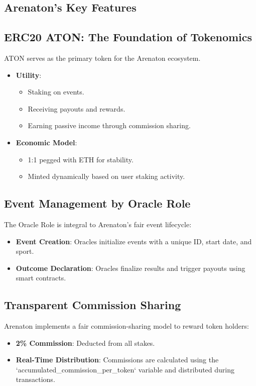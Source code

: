 \documentclass[9pt]{article}
\begin{document}
\begin{multicols}{2}
		\section{Arenaton’s Key Features}
		\subsection{ERC20 ATON: The Foundation of Tokenomics}
		ATON serves as the primary token for the Arenaton ecosystem.
		\begin{itemize}
			\item \textbf{Utility}:
			\begin{itemize}
				\item Staking on events.
				\item Receiving payouts and rewards.
				\item Earning passive income through commission sharing.
			\end{itemize}
			\item \textbf{Economic Model}:
			\begin{itemize}
				\item 1:1 pegged with ETH for stability.
				\item Minted dynamically based on user staking activity.
			\end{itemize}
		\end{itemize}
		
		\subsection{Event Management by Oracle Role}
		The Oracle Role is integral to Arenaton’s fair event lifecycle:
		\begin{itemize}
			\item \textbf{Event Creation}: Oracles initialize events with a unique ID, start date, and sport.
			\item \textbf{Outcome Declaration}: Oracles finalize results and trigger payouts using smart contracts.
		\end{itemize}
		
		\subsection{Transparent Commission Sharing}
		Arenaton implements a fair commission-sharing model to reward token holders:
		\begin{itemize}
			\item \textbf{2\% Commission}: Deducted from all stakes.
			\item \textbf{Real-Time Distribution}: Commissions are calculated using the `accumulated\_commission\_per\_token` variable and distributed during transactions.
		\end{itemize}
		

\end{multicols}
\end{document}
